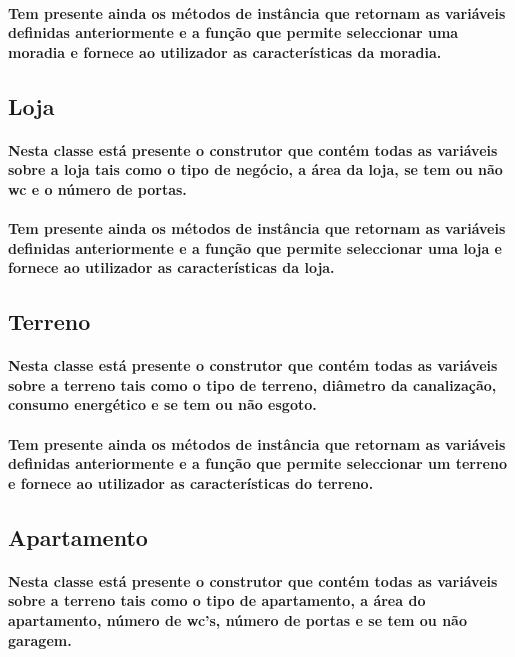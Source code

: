 \documentclass{article}
\begin{document}
\paragraph{Tem presente ainda os métodos de instância que retornam as variáveis definidas anteriormente e a função que permite seleccionar uma moradia e fornece ao utilizador as características da moradia.}

\subsection{\textbf{Loja}}
\paragraph{Nesta classe está presente o construtor que contém todas as variáveis sobre a loja tais como o tipo de negócio, a área da loja, se tem ou não wc e o número de portas.}
\paragraph{Tem presente ainda os métodos de instância que retornam as variáveis definidas anteriormente e a função que permite seleccionar uma loja e fornece ao utilizador as características da loja.}

\subsection{\textbf{Terreno}}
\paragraph{Nesta classe está presente o construtor que contém todas as variáveis sobre a terreno tais como o tipo de terreno, diâmetro da canalização, consumo energético e se tem ou não esgoto.}
\paragraph{Tem presente ainda os métodos de instância que retornam as variáveis definidas anteriormente e a função que permite seleccionar um terreno e fornece ao utilizador as características do terreno.}

\subsection{\textbf{Apartamento}}
\paragraph{Nesta classe está presente o construtor que contém todas as variáveis sobre a terreno tais como o tipo de apartamento, a área do apartamento, número de wc’s, número de portas e se tem ou não garagem.}
\end{document}
